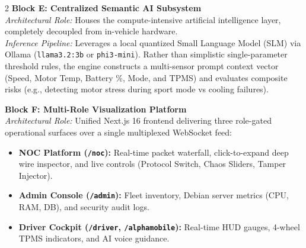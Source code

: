 \documentclass[10pt,a4paper]{article}
\begin{document}
\begin{multicols}{2}
\textbf{\textcolor{cvispurple}{Block E: Centralized Semantic AI Subsystem}}\\
\textit{Architectural Role:} Houses the compute-intensive artificial intelligence layer, completely decoupled from in-vehicle hardware.\\
\textit{Inference Pipeline:} Leverages a local quantized Small Language Model (SLM) via Ollama (\texttt{llama3.2:3b} or \texttt{phi3-mini}). Rather than simplistic single-parameter threshold rules, the engine constructs a multi-sensor prompt context vector (Speed, Motor Temp, Battery \%, Mode, and TPMS) and evaluates composite risks (e.g., detecting motor stress during sport mode vs cooling failures).

\textbf{\textcolor{cvisblue}{Block F: Multi-Role Visualization Platform}}\\
\textit{Architectural Role:} Unified Next.js 16 frontend delivering three role-gated operational surfaces over a single multiplexed WebSocket feed:
\begin{itemize}[leftmargin=*, nosep]
    \item \textbf{NOC Platform (\texttt{/noc}):} Real-time packet waterfall, click-to-expand deep wire inspector, and live controls (Protocol Switch, Chaos Sliders, Tamper Injector).
    \item \textbf{Admin Console (\texttt{/admin}):} Fleet inventory, Debian server metrics (CPU, RAM, DB), and security audit logs.
    \item \textbf{Driver Cockpit (\texttt{/driver}, \texttt{/alphamobile}):} Real-time HUD gauges, 4-wheel TPMS indicators, and AI voice guidance.
\end{itemize}

\end{multicols}
\end{document}
